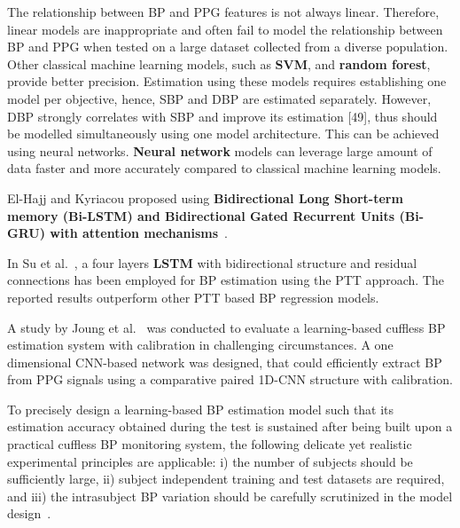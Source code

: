 The relationship between BP and PPG features is not always linear.
Therefore, linear models are inappropriate and often fail to model the relationship between BP and PPG when tested on a large dataset collected from a diverse population.
Other classical machine learning models, such as \textbf{SVM}, and \textbf{random forest}, provide better precision.
Estimation using these models requires establishing one model per objective, hence, SBP and DBP are estimated separately.
However, DBP strongly correlates with SBP and improve its estimation [49], thus should be modelled simultaneously using one model architecture.
This can be achieved using neural networks. \textbf{Neural network} models can leverage large amount of data faster and more accurately compared to classical machine learning models.

El-Hajj and Kyriacou proposed using \textbf{Bidirectional Long Short-term memory (Bi-LSTM) and Bidirectional Gated Recurrent Units (Bi-GRU) with attention mechanisms}~\cite{el-hajjDeepLearningModels2021}.

In Su et al.~\cite{suLongtermBloodPressure2018}, a four layers \textbf{LSTM} with bidirectional structure and residual connections has been employed for BP estimation using the PTT approach.
The reported results outperform other PTT based BP regression models.

A study by Joung et al.~\cite{joungContinuousCufflessBlood2023} was conducted to evaluate a learning-based cuffless BP estimation system with calibration in challenging circumstances.
A one dimensional CNN-based network was designed, that could efficiently extract BP from PPG signals using a comparative paired 1D-CNN structure with calibration.

To precisely design a learning-based BP estimation model such that its estimation accuracy obtained during the test is sustained after being built upon a practical cuffless BP monitoring system, the following delicate yet realistic experimental principles are applicable:
i) the number of subjects should be sufficiently large,
ii) subject independent training and test datasets are required, and
iii) the intrasubject BP variation should be carefully scrutinized in the model design~\cite{joungContinuousCufflessBlood2023}.